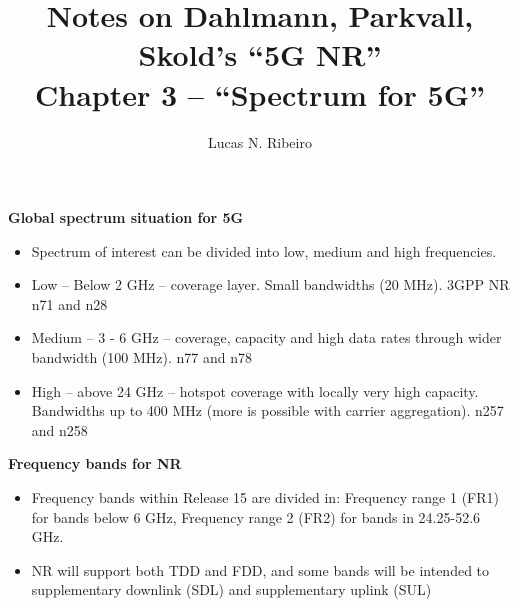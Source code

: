 \documentclass{beamer}
\title{Notes on Dahlmann, Parkvall, Skold's ``5G NR''\\Chapter 3 --  ``Spectrum for 5G''}
\author{Lucas N. Ribeiro}
\date{}
\begin{document}
	
	\frame{\titlepage}
	
	\begin{frame}[allowframebreaks]
		\textbf{Global spectrum situation for 5G}
		\begin{itemize}
			\item Spectrum of interest can be divided into low, medium and high frequencies.
			\item Low -- Below 2 GHz -- coverage layer. Small bandwidths (20 MHz). 3GPP NR n71 and n28
			\item Medium -- 3 - 6 GHz -- coverage, capacity and high data rates through wider bandwidth (100 MHz). n77 and n78
			\item High -- above 24 GHz -- hotspot coverage with locally very high capacity. Bandwidths up to 400 MHz (more is possible with carrier aggregation). n257 and n258
		\end{itemize}
	
		\textbf{Frequency bands for NR}
		\begin{itemize}
			\item Frequency bands within Release 15 are divided in: Frequency range 1 (FR1) for bands below 6 GHz, Frequency range 2 (FR2) for bands in 24.25-52.6 GHz.
			\item NR will support both TDD and FDD, and some bands will be intended to supplementary downlink (SDL) and supplementary uplink (SUL)
		\end{itemize}
	\end{frame}
\end{document}
